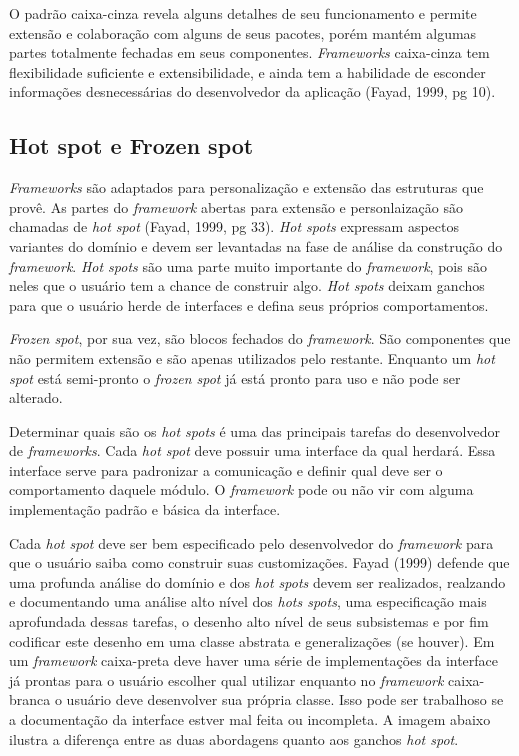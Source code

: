 O padrão caixa-cinza revela alguns detalhes de seu funcionamento e permite extensão e colaboração com alguns de seus pacotes, porém mantém algumas partes totalmente fechadas em seus componentes. \textit{Frameworks} caixa-cinza tem flexibilidade suficiente e extensibilidade, e ainda tem a habilidade de esconder informações desnecessárias do desenvolvedor da aplicação (Fayad, 1999, pg 10). 

\subsection{Hot spot e Frozen spot}

\textit{Frameworks} são adaptados para personalização e extensão das estruturas que provê. As partes do \textit{framework} abertas para extensão e personlaização são chamadas de \textit{hot spot} (Fayad, 1999, pg 33). \textit{Hot spots} expressam aspectos variantes do domínio e devem ser levantadas na fase de análise da construção do \textit{framework}. \textit{Hot spots} são uma parte muito importante do \textit{framework}, pois são neles que o usuário tem a chance de construir algo. \textit{Hot spots} deixam ganchos para que o usuário herde de interfaces e defina seus próprios comportamentos.

\textit{Frozen spot}, por sua vez, são blocos fechados do \textit{framework}. São componentes que não permitem extensão e são apenas utilizados pelo restante. Enquanto um \textit{hot spot} está semi-pronto o \textit{frozen spot} já está pronto para uso e não pode ser alterado.

Determinar quais são os \textit{hot spots} é uma das principais tarefas do desenvolvedor de \textit{frameworks}. Cada \textit{hot spot} deve possuir uma interface da qual herdará. Essa interface serve para padronizar a comunicação e definir qual deve ser o comportamento daquele módulo. O \textit{framework} pode ou não vir com alguma implementação padrão e básica da interface.

Cada \textit{hot spot} deve ser bem especificado pelo desenvolvedor do \textit{framework} para que o usuário saiba como construir suas customizações. Fayad (1999) defende que uma profunda análise do domínio e dos \textit{hot spots} devem ser realizados, realzando e documentando uma análise alto nível dos \textit{hots spots}, uma especificação mais aprofundada dessas tarefas, o desenho alto nível de seus subsistemas e por fim codificar este desenho em uma classe abstrata e generalizações (se houver). Em um \textit{framework} caixa-preta deve haver uma série de implementações da interface já prontas para o usuário escolher qual utilizar enquanto no \textit{framework} caixa-branca o usuário deve desenvolver sua própria classe. Isso pode ser trabalhoso se a documentação da interface estver mal feita ou incompleta. A imagem abaixo ilustra a diferença entre as duas abordagens quanto aos ganchos \textit{hot spot}.

